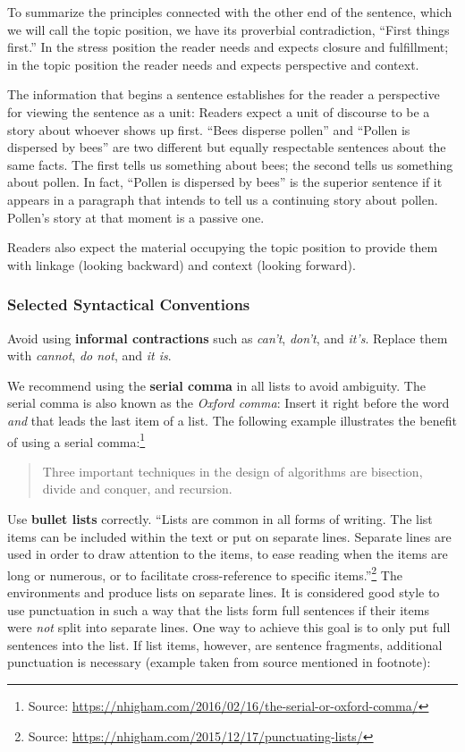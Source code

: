 To summarize the principles connected with the other end of the sentence, which we will call the topic position, we have its proverbial contradiction, “First things first.”
In the stress position the reader needs and expects closure and fulfillment; in the topic position the reader needs and expects perspective and context.

The information that begins a sentence establishes for the reader a perspective for viewing the sentence as a unit: Readers expect a unit of discourse to be a story about whoever shows up first. “Bees disperse pollen” and “Pollen is dispersed by bees” are two different but equally respectable sentences about the same facts. The first tells us something about bees; the second tells us something about pollen. In fact, “Pollen is dispersed by bees” is the superior sentence if it appears in a paragraph that intends to tell us a continuing story about pollen. Pollen’s story at that moment is a passive one.

Readers also expect the material occupying the topic position to provide them with linkage (looking backward) and context (looking forward).

\subsubsection{Selected Syntactical Conventions}

Avoid using \textbf{informal contractions} such as \emph{can't}, \emph{don't}, and \emph{it's}. Replace them with \emph{cannot}, \emph{do not}, and \emph{it is}.

We recommend using the \textbf{serial comma} in all lists to avoid ambiguity. The serial comma is also known as the \emph{Oxford comma}: Insert  it right before the word \emph{and} that leads the last item of a list. The following example illustrates the benefit of using a serial comma:\footnote{Source: \url{https://nhigham.com/2016/02/16/the-serial-or-oxford-comma/}}
\begin{quote}
  Three important techniques in the design of algorithms are bisection, divide and conquer, and recursion.
\end{quote}

Use \textbf{bullet lists} correctly. ``Lists are common in all forms of writing. The list items can be included within the text or put on separate lines. Separate lines are used in order to draw attention to the items, to ease reading when the items are long or numerous, or to facilitate cross-reference to specific items.''\footnote{Source: \url{https://nhigham.com/2015/12/17/punctuating-lists/}} The environments  and  produce lists on separate lines. It is considered good style to use punctuation in such a way that the lists form full sentences if their items were \emph{not} split into separate lines. One way to achieve this goal is to only put full sentences into the list. If list items, however, are sentence fragments, additional punctuation is necessary (example taken from source mentioned in footnote):

